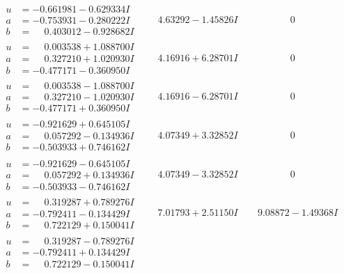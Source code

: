 \documentclass[1p]{elsarticle_modified}
\theoremstyle{definition}
\begin{document}
$$\begin{array}{c|c|c}
\begin{aligned}
u &= -0.661981 - 0.629334 I \\
a &= -0.753931 - 0.280222 I \\
b &= \phantom{-}0.403012 - 0.928682 I\end{aligned}
 & \phantom{-}4.63292 - 1.45826 I & \phantom{-0.000000 } 0 \\ \hline\begin{aligned}
u &= \phantom{-}0.003538 + 1.088700 I \\
a &= \phantom{-}0.327210 + 1.020930 I \\
b &= -0.477171 - 0.360950 I\end{aligned}
 & \phantom{-}4.16916 + 6.28701 I & \phantom{-0.000000 } 0 \\ \hline\begin{aligned}
u &= \phantom{-}0.003538 - 1.088700 I \\
a &= \phantom{-}0.327210 - 1.020930 I \\
b &= -0.477171 + 0.360950 I\end{aligned}
 & \phantom{-}4.16916 - 6.28701 I & \phantom{-0.000000 } 0 \\ \hline\begin{aligned}
u &= -0.921629 + 0.645105 I \\
a &= \phantom{-}0.057292 - 0.134936 I \\
b &= -0.503933 + 0.746162 I\end{aligned}
 & \phantom{-}4.07349 + 3.32852 I & \phantom{-0.000000 } 0 \\ \hline\begin{aligned}
u &= -0.921629 - 0.645105 I \\
a &= \phantom{-}0.057292 + 0.134936 I \\
b &= -0.503933 - 0.746162 I\end{aligned}
 & \phantom{-}4.07349 - 3.32852 I & \phantom{-0.000000 } 0 \\ \hline\begin{aligned}
u &= \phantom{-}0.319287 + 0.789276 I \\
a &= -0.792411 - 0.134429 I \\
b &= \phantom{-}0.722129 + 0.150041 I\end{aligned}
 & \phantom{-}7.01793 + 2.51150 I & \phantom{-}9.08872 - 1.49368 I \\ \hline\begin{aligned}
u &= \phantom{-}0.319287 - 0.789276 I \\
a &= -0.792411 + 0.134429 I \\
b &= \phantom{-}0.722129 - 0.150041 I\end{aligned}

\end{array}$$
\end{document}
